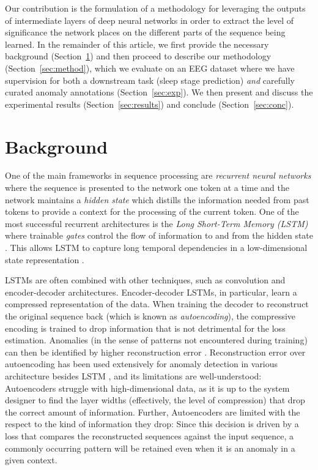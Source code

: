 \documentclass[runningheads]{llncs}
\begin{document}
Our contribution is the formulation of a methodology for leveraging
the outputs of intermediate layers of deep neural networks in order
to extract the level of significance the network places on the
different parts of the sequence being learned. In the remainder of
this article, we first provide the necessary background
(Section~\ref{sec:bg}) and then proceed to describe our
methodology (Section~\ref{sec:method}), which we evaluate on
an EEG dataset where we have supervision for both a downstream task
(sleep stage prediction) \emph{and} carefully curated anomaly
annotations (Section~\ref{sec:exp}). We then present and discuss
the experimental results (Section~\ref{sec:results}) and conclude
(Section~\ref{sec:conc}).



\section{Background}
\label{sec:bg}


One of the main frameworks in sequence processing are
\emph{recurrent neural networks} where the sequence is presented to
the network one token at a time and the network maintains a
\emph{hidden state} which distills the information needed from past
tokens to provide a context for the processing of the current token.
One of the most successful recurrent architectures is the
\emph{Long Short-Term Memory (LSTM)} where trainable \emph{gates}
control the flow of information to and from the hidden state
\cite{hochreiter-schmidhuber:1997}. This allows LSTM to capture long
temporal dependencies in a low-dimensional state representation
\cite{HOJJATI2024106106,10744017}.

LSTMs are often combined with other techniques, such as convolution
and encoder-decoder architectures. Encoder-decoder LSTMs, in
particular, learn a compressed representation of the data. When
training the decoder to reconstruct the original sequence back
(which is known as \emph{autoencoding}), the compressive encoding is
trained to drop information that is not detrimental for the loss
estimation. Anomalies (in the sense of patterns not encountered during
training) can then be identified by higher reconstruction error
\cite{SGUEGLIA2022170,aerospace6110117}.
Reconstruction error over autoencoding has been used extensively for
anomaly detection in various architecture besides LSTM
\cite{10.1145/3691338}, and its limitations are well-understood:
Autoencoders struggle with high-dimensional data, as it is up to the
system designer to find the layer widths (effectively, the level of
compression) that drop the correct amount of information.
Further, Autoencoders are limited with the respect to the kind of
information they drop: Since this decision is driven by a loss that
compares the reconstructed sequences against the input sequence, a
commonly occurring pattern will be retained even when it is an anomaly
in a given context.
\end{document}
